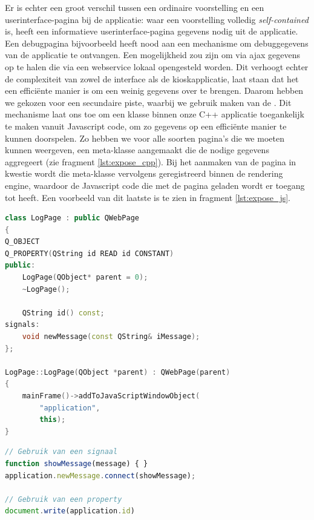 Er is echter een groot verschil tussen een ordinaire voorstelling en een userinterface-pagina bij de applicatie: waar een voorstelling volledig \emph{self-contained} is, heeft een informatieve userinterface-pagina gegevens nodig uit de applicatie. Een debugpagina bijvoorbeeld heeft nood aan een mechanisme om debuggegevens van de applicatie te ontvangen.
Een mogelijkheid zou zijn om via \ac{ajax} gegevens op te halen die via een webservice lokaal opengesteld worden. Dit verhoogt echter de complexiteit van zowel de interface als de kioskapplicatie, laat staan dat het een efficiënte manier is om een weinig gegevens over te brengen. Daarom hebben we gekozen voor een secundaire piste, waarbij we gebruik maken van de . Dit mechanisme laat ons toe om een klasse binnen onze C++ applicatie toegankelijk te maken vanuit Javascript code, om zo gegevens op een efficiënte manier te kunnen doorspelen. Zo hebben we voor alle soorten pagina's die we moeten kunnen weergeven, een meta-klasse aangemaakt die de nodige gegevens aggregeert (zie fragment \ref{lst:expose_cpp}). Bij het aanmaken van de pagina in kwestie wordt die meta-klasse vervolgens geregistreerd binnen de rendering engine, waardoor de Javascript code die met de pagina geladen wordt er toegang tot heeft. Een voorbeeld van dit laatste is te zien in fragment \ref{lst:expose_js}.

\begin{lstlisting}[language=C++, float, caption=Registratie van een klasse binnen de rendering engine., label=lst:expose_cpp]
class LogPage : public QWebPage
{
Q_OBJECT
Q_PROPERTY(QString id READ id CONSTANT)
public:
    LogPage(QObject* parent = 0);
    ~LogPage();

    QString id() const;
signals:
    void newMessage(const QString& iMessage);
};

LogPage::LogPage(QObject *parent) : QWebPage(parent)
{
    mainFrame()->addToJavaScriptWindowObject(
    	"application",
        this);
}
\end{lstlisting}

\begin{lstlisting}[language=JavaScript, float, caption=Gebruik van een geregistreerde C++ klasse., label=lst:expose_js]
// Gebruik van een signaal
function showMessage(message) { }
application.newMessage.connect(showMessage);

// Gebruik van een property
document.write(application.id)
\end{lstlisting}


